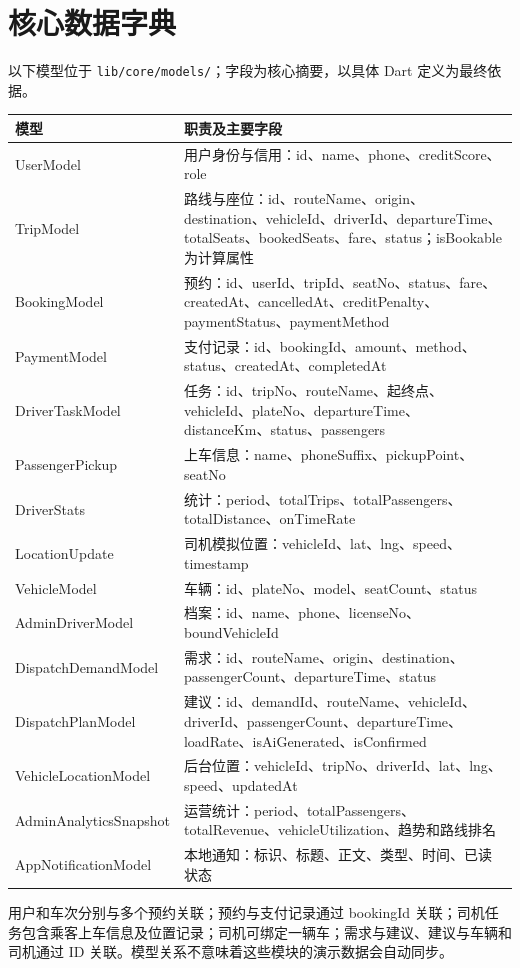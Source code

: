 \documentclass[UTF8,fontset=fandol,zihao=-4,oneside]{ctexrep}
\newcommand{\pathcode}[1]{\nolinkurl{#1}}
\begin{document}
\section{核心数据字典}
以下模型位于 \pathcode{lib/core/models/}；字段为核心摘要，以具体 Dart 定义为最终依据。
\small
\begin{longtable}{p{4.2cm}p{10.5cm}}
\toprule 模型 & 职责及主要字段 \\ \midrule
UserModel & 用户身份与信用：id、name、phone、creditScore、role \\
TripModel & 路线与座位：id、routeName、origin、destination、vehicleId、driverId、departureTime、totalSeats、bookedSeats、fare、status；isBookable 为计算属性 \\
BookingModel & 预约：id、userId、tripId、seatNo、status、fare、createdAt、cancelledAt、creditPenalty、paymentStatus、paymentMethod \\
PaymentModel & 支付记录：id、bookingId、amount、method、status、createdAt、completedAt \\
DriverTaskModel & 任务：id、tripNo、routeName、起终点、vehicleId、plateNo、departureTime、distanceKm、status、passengers \\
PassengerPickup & 上车信息：name、phoneSuffix、pickupPoint、seatNo \\
DriverStats & 统计：period、totalTrips、totalPassengers、totalDistance、onTimeRate \\
LocationUpdate & 司机模拟位置：vehicleId、lat、lng、speed、timestamp \\
VehicleModel & 车辆：id、plateNo、model、seatCount、status \\
AdminDriverModel & 档案：id、name、phone、licenseNo、boundVehicleId \\
DispatchDemandModel & 需求：id、routeName、origin、destination、passengerCount、departureTime、status \\
DispatchPlanModel & 建议：id、demandId、routeName、vehicleId、driverId、passengerCount、departureTime、loadRate、isAiGenerated、isConfirmed \\
VehicleLocationModel & 后台位置：vehicleId、tripNo、driverId、lat、lng、speed、updatedAt \\
AdminAnalyticsSnapshot & 运营统计：period、totalPassengers、totalRevenue、vehicleUtilization、趋势和路线排名 \\
AppNotificationModel & 本地通知：标识、标题、正文、类型、时间、已读状态 \\
\bottomrule
\end{longtable}
\normalsize
用户和车次分别与多个预约关联；预约与支付记录通过 bookingId 关联；司机任务包含乘客上车信息及位置记录；司机可绑定一辆车；需求与建议、建议与车辆和司机通过 ID 关联。模型关系不意味着这些模块的演示数据会自动同步。
\end{document}
